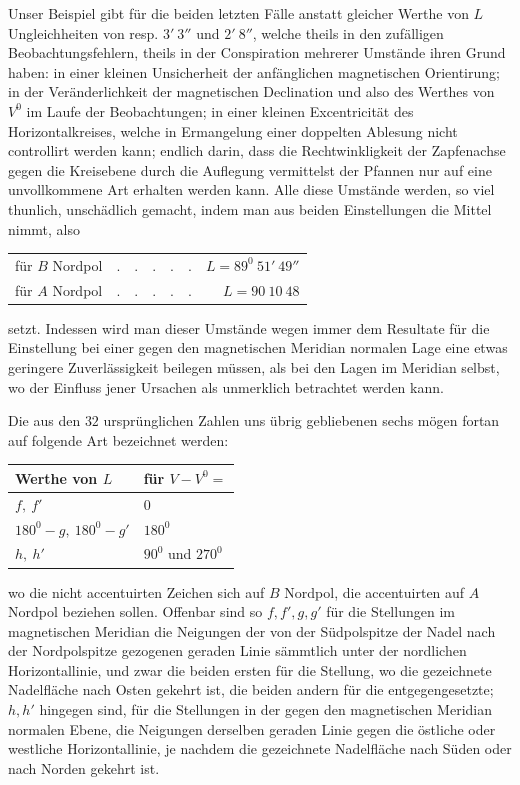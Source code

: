 Unser Beispiel gibt für die beiden letzten Fälle anstatt gleicher Werthe von $L$ Ungleichheiten von resp. $3'\ 3''$ und $2'\ 8''$, welche theils in den zufälligen Beobachtungsfehlern, theils in der Conspiration mehrerer Umstände ihren Grund haben: in einer kleinen Unsicherheit der anfänglichen magnetischen Orientirung; in der Veränderlichkeit der magnetischen Declination und also des Werthes von $V^0$ im Laufe der Beobachtungen; in einer kleinen Excentricität des Horizontalkreises, welche in Ermangelung einer doppelten Ablesung nicht controllirt werden kann; endlich darin, dass die Rechtwinkligkeit der Zapfenachse gegen die Kreisebene durch die Auflegung vermittelst der Pfannen nur auf eine unvollkommene Art erhalten werden kann. Alle diese Umstände werden, so viel thunlich, unschädlich gemacht, indem man aus beiden Einstellungen die Mittel nimmt, also

\begin{center}
\begin{tabular}{llr}
für $B$ Nordpol&$.\quad.\quad.\quad.\quad.$&$L=89^0\ 51'\ 49''$\\
für $A$ Nordpol&$.\quad.\quad.\quad.\quad.$&$L=90\ 10\ 48$
\end{tabular}
\end{center}
setzt. Indessen wird man dieser Umstände wegen immer dem Resultate für die Einstellung bei einer gegen den magnetischen Meridian normalen Lage eine etwas geringere Zuverlässigkeit beilegen müssen, als bei den Lagen im Meridian selbst, wo der Einfluss jener Ursachen als unmerklich betrachtet werden kann.

Die aus den $32$ ursprünglichen Zahlen uns übrig gebliebenen sechs mögen fortan auf folgende Art bezeichnet werden:
\begin{center}
\begin{tabular}{l|l}
Werthe von $L$&für $V-V^0=$\\\hline
$f,\ f'$&$0$\\
$180^0-g,\ 180^0-g'$&$180^0$\\
$h,\ h'$&$90^0$ und $270^0$
\end{tabular}
\end{center}
wo die nicht accentuirten Zeichen sich auf $B$ Nordpol, die accentuirten auf $A$ Nordpol beziehen sollen. Offenbar sind so $f,f',g,g'$ für die Stellungen im magnetischen Meridian die Neigungen der von der Südpolspitze der Nadel nach der Nordpolspitze gezogenen geraden Linie sämmtlich unter der nordlichen Horizontallinie, und zwar die beiden ersten für die Stellung, wo die gezeichnete Nadelfläche nach Osten gekehrt ist, die beiden andern für die entgegengesetzte; $h,h'$ hingegen sind, für die Stellungen in der gegen den magnetischen Meridian normalen Ebene, die Neigungen derselben geraden Linie gegen die östliche oder westliche Horizontallinie, je nachdem die gezeichnete Nadelfläche nach Süden oder nach Norden gekehrt ist.

